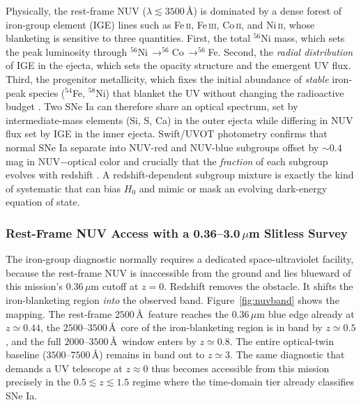 \documentclass[10pt,onecolumn]{article}
\begin{document}
Physically, the rest-frame NUV ($\lambda\lesssim3500$\,\AA) is dominated by a dense forest of iron-group element (IGE) lines such as Fe\,\textsc{ii}, Fe\,\textsc{iii}, Co\,\textsc{ii}, and Ni\,\textsc{ii}, whose blanketing is sensitive to three quantities. First, the total $^{56}$Ni mass, which sets the peak luminosity through $^{56}$Ni\,$\to^{56}$Co\,$\to^{56}$Fe. Second, the \emph{radial distribution} of IGE in the ejecta, which sets the opacity structure and the emergent UV flux. Third, the progenitor metallicity, which fixes the initial abundance of \emph{stable} iron-peak species ($^{54}$Fe, $^{58}$Ni) that blanket the UV without changing the radioactive budget \cite{lentz2000}. Two SNe Ia can therefore share an optical spectrum, set by intermediate-mass elements (Si, S, Ca) in the outer ejecta while differing in NUV flux set by IGE in the inner ejecta. Swift/UVOT photometry confirms that normal SNe Ia separate into NUV-red and NUV-blue subgroups offset by $\sim0.4$\,mag in NUV$-$optical color and crucially that the \emph{fraction} of each subgroup evolves with redshift \cite{milne2015}. A redshift-dependent subgroup mixture is exactly the kind of systematic that can bias $H_0$ and mimic or mask an evolving dark-energy equation of state.

\subsubsection{Rest-Frame NUV Access with a 0.36--3.0\,$\mu$m Slitless Survey}

The iron-group diagnostic normally requires a dedicated space-ultraviolet facility, because the rest-frame NUV is inaccessible from the ground and lies blueward of this mission's $0.36\,\mu$m cutoff at $z=0$. Redshift removes the obstacle. It shifts the iron-blanketing region \emph{into} the observed band. Figure~\ref{fig:nuvband} shows the mapping. The rest-frame $2500$\,\AA\ feature reaches the $0.36\,\mu$m blue edge already at $z\simeq0.44$, the $2500$--$3500$\,\AA\ core of the iron-blanketing region is in band by $z\simeq0.5$, and the full $2000$--$3500$\,\AA\ window enters by $z\simeq0.8$. The entire optical-twin baseline ($3500$--$7500$\,\AA) remains in band out to $z\simeq3$. The same diagnostic that demands a UV telescope at $z\approx0$ thus becomes accessible from this mission precisely in the $0.5\lesssim z\lesssim1.5$ regime where the time-domain tier already classifies SNe Ia.
\end{document}
